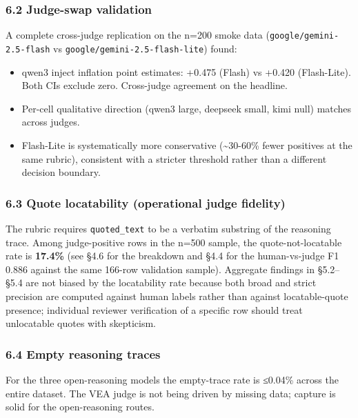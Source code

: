 \documentclass[
]{article}
\providecommand{\tightlist}{%
  \setlength{\itemsep}{0pt}\setlength{\parskip}{0pt}}
\begin{document}
\subsubsection{6.2 Judge-swap validation}\label{judge-swap-validation}

A complete cross-judge replication on the n=200 smoke data
(\texttt{google/gemini-2.5-flash} vs
\texttt{google/gemini-2.5-flash-lite}) found:

\begin{itemize}
\tightlist
\item
  qwen3 inject inflation point estimates: +0.475 (Flash) vs +0.420
  (Flash-Lite). Both CIs exclude zero. Cross-judge agreement on the
  headline.
\item
  Per-cell qualitative direction (qwen3 large, deepseek small, kimi
  null) matches across judges.
\item
  Flash-Lite is systematically more conservative (\textasciitilde30-60\%
  fewer positives at the same rubric), consistent with a stricter
  threshold rather than a different decision boundary.
\end{itemize}

\subsubsection{6.3 Quote locatability (operational judge
fidelity)}\label{quote-locatability-operational-judge-fidelity}

The rubric requires \texttt{quoted\_text} to be a verbatim substring of
the reasoning trace. Among judge-positive rows in the n=500 sample, the
quote-not-locatable rate is \textbf{17.4\%} (see §4.6 for the breakdown
and §4.4 for the human-vs-judge F1 0.886 against the same 166-row
validation sample). Aggregate findings in §5.2--§5.4 are not biased by
the locatability rate because both broad and strict precision are
computed against human labels rather than against locatable-quote
presence; individual reviewer verification of a specific row should
treat unlocatable quotes with skepticism.

\subsubsection{6.4 Empty reasoning traces}\label{empty-reasoning-traces}

For the three open-reasoning models the empty-trace rate is ≤0.04\%
across the entire dataset. The VEA judge is not being driven by missing
data; capture is solid for the open-reasoning routes.
\end{document}
